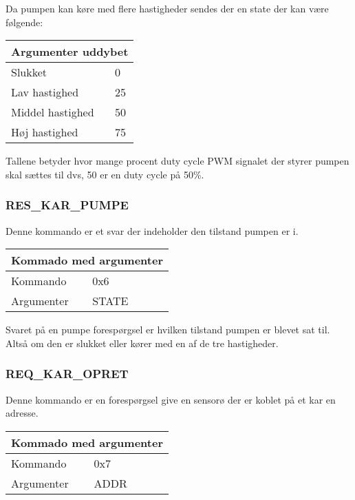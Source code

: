 Da pumpen kan køre med flere hastigheder sendes der en state der kan være følgende:

\begin{table}[H]
\setlength{\parindent}{12pt}
\begin{tabular}{|l|l|}
\hline
\multicolumn{2}{|c|}{Argumenter uddybet}\\\hline
Slukket & 0 \\
Lav hastighed & 25 \\
Middel hastighed & 50 \\
Høj hastighed & 75 \\\hline
\end{tabular}
\end{table}

Tallene betyder hvor mange procent duty cycle PWM signalet der styrer pumpen skal sættes til dvs, 50 er en duty cycle på 50\%.

\subsubsection{RES\_KAR\_PUMPE}
Denne kommando er et svar der indeholder den tilstand pumpen er i.

\begin{table}[H]
\setlength{\parindent}{12pt}
\begin{tabular}{|l|lcc|}
\hline
\multicolumn{4}{|c|}{Kommado med argumenter}\\\hline
Kommando & 0x6 & & \\
Argumenter & STATE & & \\\hline
\end{tabular}
\end{table}


Svaret på en pumpe forespørgsel er hvilken tilstand pumpen er blevet sat til. Altså om den er slukket eller kører med en af de tre hastigheder.


\subsubsection{REQ\_KAR\_OPRET}
Denne kommando er en forespørgsel give en sensorø der er koblet på et kar en adresse.

\begin{table}[H]
\setlength{\parindent}{12pt}
\begin{tabular}{|l|lcc|}
\hline
\multicolumn{4}{|c|}{Kommado med argumenter}\\\hline
Kommando & 0x7 & & \\
Argumenter & ADDR & & \\\hline
\end{tabular}
\end{table}


